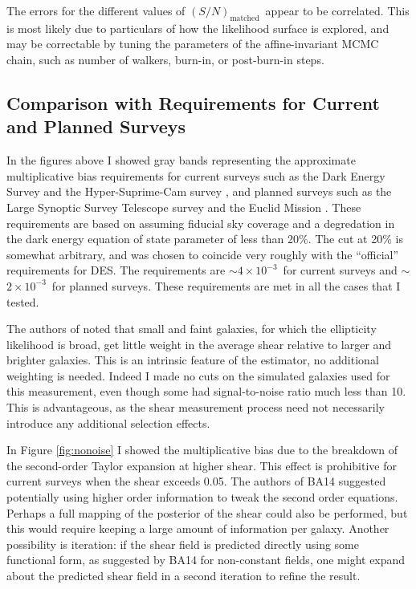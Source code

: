 \documentclass[12pt,preprint]{aastex}
\newcommand{\Msn}{$(S/N)_{\textrm{matched}}$}
\newcommand{\desreq}{$4\times 10^{-3}$}
\newcommand{\lsstreq}{$2\times 10^{-3}$}
\begin{document}
The errors for the different values of \Msn\ appear to be correlated.  This is
most likely due to particulars of how the likelihood surface is explored,
and may be correctable by tuning the parameters of the affine-invariant
MCMC chain, such as number of walkers, burn-in, or post-burn-in steps.

\subsection{Comparison with Requirements for Current and Planned Surveys}
\label{sec:req}

In the figures above I showed gray bands representing the approximate
multiplicative bias requirements for current surveys such as the Dark Energy
Survey \citep[][DES]{DESWhitePaper} and the Hyper-Suprime-Cam survey
\citep[][HSC]{HSC12}, and planned surveys such as the Large Synoptic Survey
Telescope survey \citep[][LSST]{IvezicLSST08} and the Euclid Mission
\citep{Euclid2011}.  These requirements are based on
\citep{HutererSystematics06} assuming fiducial sky coverage and a degredation
in the dark energy equation of state parameter of less than 20\%.  The cut at
20\% is somewhat arbitrary, and was chosen to coincide very roughly with the
``official'' requirements for DES. The requirements are $\sim$\desreq\ for
current surveys and $\sim$\lsstreq\ for planned surveys.  These requirements
are met in all the cases that I tested.

The authors of \cite{ba14} noted that small and faint galaxies, for which the
ellipticity likelihood is broad, get little weight in the average shear
relative to larger and brighter galaxies.  This is an intrinsic feature of the
estimator, no additional weighting is needed.  Indeed I made no cuts on the
simulated galaxies used for this measurement, even though some had
signal-to-noise ratio much less than 10.  This is advantageous, as the shear
measurement process need  not necessarily introduce any additional selection
effects.

In Figure \ref{fig:nonoise} I showed the multiplicative bias due to the
breakdown of the second-order Taylor expansion at higher shear.   This effect
is prohibitive for current surveys when the shear exceeds 0.05.  The authors of
BA14 suggested potentially using higher order information to tweak the second
order equations.  Perhaps a full mapping of the posterior of the shear could
also be performed, but this would require keeping a large amount of information
per galaxy.  Another possibility is iteration: if the shear field is predicted
directly using some functional form, as suggested by BA14 for non-constant
fields, one might expand about the predicted shear field in a second iteration
to refine the result.
\end{document}

